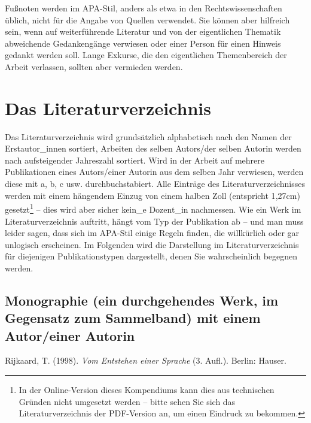 \documentclass[
  bibliography=totoc,
  oneside,
  12pt,
  a4paper]{scrbook}
\begin{document}
Fußnoten werden im APA-Stil, anders als etwa in den Rechtswissenschaften
üblich, nicht für die Angabe von Quellen verwendet. Sie können aber
hilfreich sein, wenn auf weiterführende Literatur und von der
eigentlichen Thematik abweichende Gedankengänge verwiesen oder einer
Person für einen Hinweis gedankt werden soll. Lange Exkurse, die den
eigentlichen Themenbereich der Arbeit verlassen, sollten aber vermieden
werden.

\hypertarget{das-literaturverzeichnis}{%
\section{Das Literaturverzeichnis}\label{das-literaturverzeichnis}}

Das Literaturverzeichnis wird grundsätzlich alphabetisch nach den Namen
der Erstautor\_innen sortiert, Arbeiten des selben Autors/der selben
Autorin werden nach aufsteigender Jahreszahl sortiert. Wird in der
Arbeit auf mehrere Publikationen eines Autors/einer Autorin aus dem
selben Jahr verwiesen, werden diese mit a, b, c usw. durchbuchstabiert.
Alle Einträge des Literaturverzeichnisses werden mit einem hängendem
Einzug von einem halben Zoll (entspricht 1{,}27cm) gesetzt\footnote{In der Online-Version dieses Kompendiums kann dies aus technischen Gründen nicht umgesetzt werden -- bitte sehen Sie sich das Literaturverzeichnis der PDF-Version an, um einen Eindruck zu bekommen.} --
dies wird aber sicher kein\_e Dozent\_in nachmessen. Wie ein Werk im
Literaturverzeichnis auftritt, hängt vom Typ der Publikation ab -- und
man muss leider sagen, dass sich im APA-Stil einige Regeln finden, die
willkürlich oder gar unlogisch erscheinen. Im Folgenden wird die
Darstellung im Literaturverzeichnis für diejenigen Publikationstypen
dargestellt, denen Sie wahrscheinlich begegnen werden.

\hypertarget{monographie-ein-durchgehendes-werk-im-gegensatz-zum-sammelband-mit-einem-autoreiner-autorin}{%
\subsection*{Monographie (ein durchgehendes Werk, im Gegensatz zum Sammelband) mit einem Autor/einer Autorin}\label{monographie-ein-durchgehendes-werk-im-gegensatz-zum-sammelband-mit-einem-autoreiner-autorin}}

Rijkaard, T. (1998). \emph{Vom Entstehen einer Sprache} (3. Aufl.). Berlin: Hauser.
\end{document}
